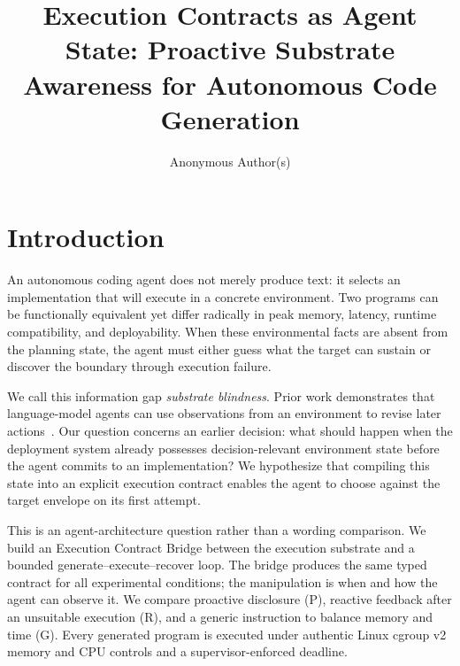 \documentclass[sigconf,anonymous]{aamas}
\title[Execution Contracts as Agent State]{Execution Contracts as Agent State: Proactive Substrate Awareness for Autonomous Code Generation}
\author{Anonymous Author(s)}
\begin{document}
\maketitle

\section{Introduction}

An autonomous coding agent does not merely produce text: it selects an
implementation that will execute in a concrete environment. Two programs can be
functionally equivalent yet differ radically in peak memory, latency, runtime
compatibility, and deployability. When these environmental facts are absent from
the planning state, the agent must either guess what the target can sustain or
discover the boundary through execution failure.

We call this information gap \emph{substrate blindness}. Prior work demonstrates
that language-model agents can use observations from an environment to revise
later actions~\cite{yao2023react,shinn2023reflexion,madaan2023selfrefine}. Our
question concerns an earlier decision: what should happen when the deployment
system already possesses decision-relevant environment state before the agent
commits to an implementation? We hypothesize that compiling this state into an
explicit execution contract enables the agent to choose against the target
envelope on its first attempt.

This is an agent-architecture question rather than a wording comparison. We build
an Execution Contract Bridge between the execution substrate and a bounded
generate--execute--recover loop. The bridge produces the same typed contract for
all experimental conditions; the manipulation is when and how the agent can
observe it. We compare proactive disclosure (P), reactive feedback after an
unsuitable execution (R), and a generic instruction to balance memory and time
(G). Every generated program is executed under authentic Linux cgroup v2 memory
and CPU controls and a supervisor-enforced deadline.
\end{document}
